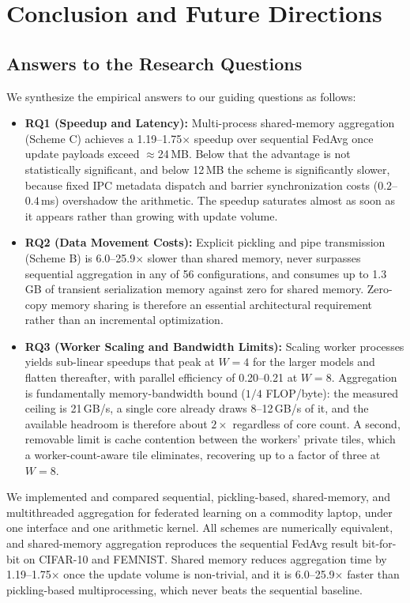 \documentclass[conference]{IEEEtran}
\begin{document}
\section{Conclusion and Future Directions}
\subsection{Answers to the Research Questions}
We synthesize the empirical answers to our guiding questions as follows:
\begin{itemize}
\item \textbf{RQ1 (Speedup and Latency):} Multi-process shared-memory aggregation (Scheme C) achieves a 1.19--1.75$\times$ speedup over sequential FedAvg once update payloads exceed $\approx$24\,MB. Below that the advantage is not statistically significant, and below 12\,MB the scheme is significantly slower, because fixed IPC metadata dispatch and barrier synchronization costs ($0.2$--$0.4$\,ms) overshadow the arithmetic. The speedup saturates almost as soon as it appears rather than growing with update volume.
\item \textbf{RQ2 (Data Movement Costs):} Explicit pickling and pipe transmission (Scheme B) is 6.0--25.9$\times$ slower than shared memory, never surpasses sequential aggregation in any of 56 configurations, and consumes up to 1.3\,GB of transient serialization memory against zero for shared memory. Zero-copy memory sharing is therefore an essential architectural requirement rather than an incremental optimization.
\item \textbf{RQ3 (Worker Scaling and Bandwidth Limits):} Scaling worker processes yields sub-linear speedups that peak at $W=4$ for the larger models and flatten thereafter, with parallel efficiency of 0.20--0.21 at $W=8$. Aggregation is fundamentally memory-bandwidth bound ($1/4$ FLOP/byte): the measured ceiling is 21\,GB/s, a single core already draws 8--12\,GB/s of it, and the available headroom is therefore about $2\times$ regardless of core count. A second, removable limit is cache contention between the workers' private tiles, which a worker-count-aware tile eliminates, recovering up to a factor of three at $W=8$.
\end{itemize}

We implemented and compared sequential, pickling-based, shared-memory, and multithreaded aggregation for federated learning on a commodity laptop, under one interface and one arithmetic kernel. All schemes are numerically equivalent, and shared-memory aggregation reproduces the sequential FedAvg result bit-for-bit on CIFAR-10 and FEMNIST. Shared memory reduces aggregation time by 1.19--1.75$\times$ once the update volume is non-trivial, and it is 6.0--25.9$\times$ faster than pickling-based multiprocessing, which never beats the sequential baseline.
\end{document}
